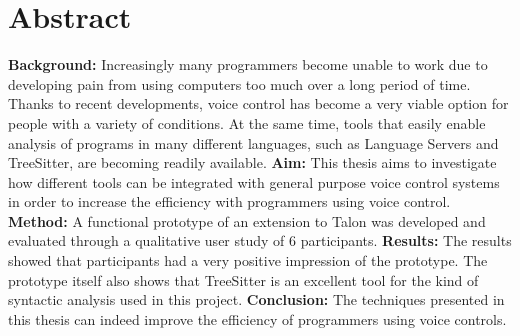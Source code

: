 \documentclass[../thesis.tex]{subfiles}
\begin{document}
\chapter*{Abstract}
\textbf{Background:}
Increasingly many programmers become unable to work
due to developing pain from using computers
too much over a long period of time.
Thanks to recent developments, voice control has become a very viable option
for people with a variety of conditions.
At the same time, tools that easily enable
analysis of programs in many different languages,
such as Language Servers and TreeSitter, are becoming readily available.
\newline
\textbf{Aim:} 
This thesis aims to investigate how different tools
can be integrated with general purpose voice control systems
in order to increase the efficiency with programmers using voice control.
\newline
\textbf{Method:} A functional prototype of an extension to Talon was developed and evaluated through
a qualitative user study of 6 participants.
\newline
\textbf{Results:} The results showed that participants
had a very positive impression of the prototype.
The prototype itself also shows that TreeSitter is an excellent tool
for the kind of syntactic analysis used in this project.
\newline
\textbf{Conclusion:} 
The techniques presented in this thesis
can indeed improve the efficiency of programmers using voice controls.

\end{document}
